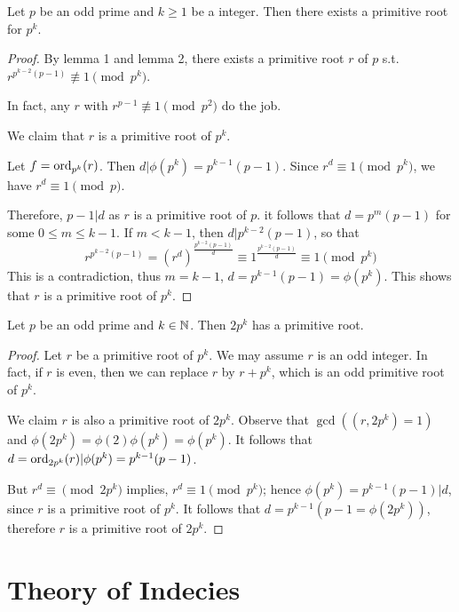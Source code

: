 \begin{theorem}
    Let $p$ be an odd prime and $k \geq 1$ be a integer. Then 
    there exists a primitive root for $p^k$.
\end{theorem}
\begin{proof}
    By lemma 1 and lemma 2, there exists a primitive root $r$ of $p$ s.t. 
    $r^{p^{k-2}(p-1)} \not\equiv 1 \pmod {p^k}$.

    In fact, any $r$ with $r^{p-1} \not\equiv 1 \pmod {p^2}$ do the job.
    
    We claim that $r$ is a primitive root of $p^k$.

    Let $f = \text{ord}_{p^k}(r)$. Then $d | \phi(p^k) = p^{k-1}(p-1)$.
    Since $r^d \equiv 1 \pmod {p^k}$, we have $r^d \equiv 1 \pmod p$.

    Therefore, $p - 1 | d$ as $r$ is a primitive root of $p$.
    it follows that $d = p^m(p-1)$ for some $0 \leq m \leq k-1$.
    If $m < k-1$, then $d | p^{k-2}(p-1)$, so that
    \[
        r^{p^{k-2}(p-1)} = {(r^d)}^{\frac{p^{k-2}(p-1)}{d}} \equiv 1^{\frac{p^{k-2}(p-1)}{d}} \equiv 1 \pmod {p^k}
    \]
    This is a contradiction, thus $m = k-1$, $d = p^{k-1}(p-1) = \phi(p^k)$.
    This shows that $r$ is a primitive root of $p^k$.
\end{proof}

\begin{corollary}
    Let $p$ be an odd prime and $k \in \mathbb{N}$. Then $2p^k$ has a primitive root.
\end{corollary}
\begin{proof}
    Let $r$ be a primitive root of $p^k$. We may assume
    $r$ is an odd integer.
    In fact, if $r$ is even, then we can replace $r$ by $r + p^k$, which is 
    an odd primitive root of $p^k$.

    We claim $r$ is also a primitive root of $2p^k$.
    Observe that $\gcd((r, 2p^k) = 1)$ and $\phi(2p^k) = \phi(2)\phi(p^k) = \phi(p^k)$.
    It follows that $d = \text{ord}_{2p^k}(r) | \phi(p^k) = p^{k-1}(p-1)$.

    But $r^d \equiv \pmod {2p^k}$ implies, $r^d \equiv 1 \pmod {p^k}$;
    hence $\phi(p^k) = p^{k-1}(p-1) | d$, since $r$ is a primitive root of $p^k$.
    It follows that $d = p^{k-1}(p-1 = \phi(2p^k))$, therefore $r$ is a primitive root of $2p^k$.
\end{proof}

\section{Theory of Indecies}

